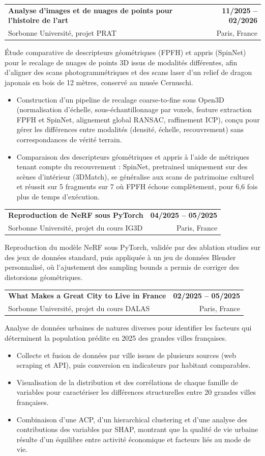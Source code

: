 \documentclass[a4paper,12pt]{article}
\makeatletter
\newcommand{\resumeItem}[1]{
  \item\small{
    {#1\vspace{-1pt}}
  }
}
\newcommand{\resumeProjectHeadingFourItemResearch}[4]{
    \needspace{6\baselineskip}\item
    \begin{tabular*}{1.001\textwidth}{l@{\extracolsep{\fill}}r}
      #1 & \textbf{#2}\\
      {#3} & \textnormal{#4} \\
    \end{tabular*}\vspace{-7pt}
}
\newcommand{\resumeItemListStart}{\begin{itemize}}
\newcommand{\resumeItemListEnd}{\end{itemize}\vspace{-5pt}}
\newcommand{\projectdesc}[1]{%
  {\fontsize{11pt}{12pt}\selectfont #1}\vspace{-6pt}%
}
\makeatother
\begin{document}
    \resumeProjectHeadingFourItemResearch
    {\textbf{Analyse d'images et de nuages de points pour l'histoire de l'art}}{11/2025 -- 02/2026}{Sorbonne Université, projet PRAT}{Paris, France}

    \projectdesc{Étude comparative de descripteurs géométriques (FPFH) et appris (SpinNet) pour le recalage de nuages de points 3D issus de modalités différentes, afin d'aligner des scans photogrammétriques et des scans laser d'un relief de dragon japonais en bois de 12 mètres, conservé au musée Cernuschi.}
    \resumeItemListStart
      \resumeItem{Construction d'un pipeline de recalage coarse-to-fine sous Open3D (normalisation d'échelle, sous-échantillonnage par voxels, feature extraction FPFH et SpinNet, alignement global RANSAC, raffinement ICP), conçu pour gérer les différences entre modalités (densité, échelle, recouvrement) sans correspondances de vérité terrain.}
      \resumeItem{Comparaison des descripteurs géométriques et appris à l'aide de métriques tenant compte du recouvrement : SpinNet, pretrained uniquement sur des scènes d'intérieur (3DMatch), se généralise aux scans de patrimoine culturel et réussit sur 5 fragments sur 7 où FPFH échoue complètement, pour 6,6 fois plus de temps d'exécution.}
    \resumeItemListEnd

    \resumeProjectHeadingFourItemResearch
    {\textbf{Reproduction de NeRF sous PyTorch}}{04/2025 -- 05/2025}
    {Sorbonne Université, projet du cours IG3D}{Paris, France}

    \projectdesc{Reproduction du modèle NeRF sous PyTorch, validée par des ablation studies sur des jeux de données standard, puis appliquée à un jeu de données Blender personnalisé, où l'ajustement des sampling bounds a permis de corriger des distorsions géométriques.}

    \resumeProjectHeadingFourItemResearch
    {\textbf{What Makes a Great City to Live in France}}{02/2025 -- 05/2025}
    {Sorbonne Université, projet du cours DALAS}{Paris, France}

    \projectdesc{Analyse de données urbaines de natures diverses pour identifier les facteurs qui déterminent la population prédite en 2025 des grandes villes françaises.}
    \resumeItemListStart
      \resumeItem{Collecte et fusion de données par ville issues de plusieurs sources (web scraping et API), puis conversion en indicateurs par habitant comparables.}
      \resumeItem{Visualisation de la distribution et des corrélations de chaque famille de variables pour caractériser les différences structurelles entre 20 grandes villes françaises.}
      \resumeItem{Combinaison d'une ACP, d'un hierarchical clustering et d'une analyse des contributions des variables par SHAP, montrant que la qualité de vie urbaine résulte d'un équilibre entre activité économique et facteurs liés au mode de vie.}
    \resumeItemListEnd
\end{document}
